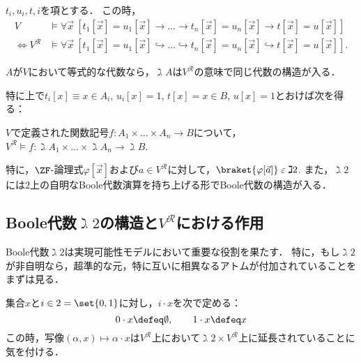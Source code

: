 \documentclass[realisability.tex]{subfiles}
\begin{document}
\begin{theorem}
 $t_i, u_i, t, i$を項とする．
 この時，
\begin{align*}
 V &\models \forall \vec{x}\: \left[t_1[\vec{x}] = u_1[\vec{x}] \to \dots \to t_n[\vec{x}] = u_n[\vec{x}] \to t[\vec{x}] = u[\vec{x}]\right]\\
 \iff 
 V^{\mathcal{R}} &\models
 \forall \vec{x}\: \left[t_1[\vec{x}] = u_1[\vec{x}] \hookrightarrow \dots \hookrightarrow t_n[\vec{x}] = u_n[\vec{x}] \hookrightarrow t[\vec{x}] = u[\vec{x}]\right].
\end{align*}
\end{theorem}
\begin{corollary}
 $A$が$V$において等式的な代数なら，$\gimel A$は$V^{\mathcal{R}}$の意味で同じ代数の構造が入る．
\end{corollary}

特に上で$t_i[x] \equiv x \in A_i$, $u_i[x] = 1$, $t[x] = x \in B$, $u[x] = 1$とおけば次を得る：

\begin{theorem}
 $V$で定義された関数記号$f: A_1 \times \dots \times A_n \to B$について，
 $V^{\mathcal{R}} \models f: \gimel A_1 \times \dots \times \gimel A_n \to \gimel B$.

 特に，$\ZF$-論理式$\varphi[\vec{x}]$および$a \in V^{\mathcal{R}}$に対して，$\braket{ \varphi[\vec{a}]} \strin \gimel 2$.
 また，$\gimel 2$には$2$上の自明なBoole代数演算を持ち上げる形でBoole代数の構造が入る．
\end{theorem}

\subsection{Boole代数$\gimel 2$の構造と$V^{\mathcal{R}}$における作用}
Boole代数$\gimel 2$は実現可能性モデルにおいて重要な役割を果たす．
特に，もし$\gimel 2$が非自明なら，超準的な元，特に互いに相異なるアトムが付加されていることをまずは見る．

\begin{definition}
 集合$x$と$i \in 2 = \set{0, 1}$に対し，$i \cdot x$を次で定める：
 \[
  0 \cdot x \defeq \emptyset, \qquad 1 \cdot x \defeq x
 \]
 この時，写像$(\alpha, x) \mapsto \alpha \cdot x$は$V^{\mathcal{R}}$上において$\gimel 2 \times V^{\mathcal{R}}$上に延長されていることに気を付ける．
\end{definition}
\end{document}
